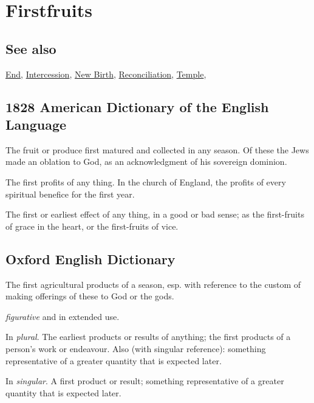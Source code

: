 \section{Firstfruits}
	\label{FIRSTFRUITS}
	
\subsection{See also}

	\hyperref[END]{End}, \hyperref[INTERCESSION]{Intercession}, \hyperref[NEWBIRTH]{New Birth}, \hyperref[RECONCILIATION]{Reconciliation}, \hyperref[TEMPLE]{Temple},

\subsection{1828 American Dictionary of the English Language} %
	\label{FIRSTFRUITS-1828}

	\begin{compactenum}
		\item[1] The fruit or produce first matured and collected in any season. Of these the Jews made an oblation to God, as an acknowledgment of his sovereign dominion.
		\item[2] The first profits of any thing. In the church of England, the profits of every spiritual benefice for the first year.
		\item[3] The first or earliest effect of any thing, in a good or bad sense; as the first-fruits of grace in the heart, or the first-fruits of vice.
	\end{compactenum}

\subsection{Oxford English Dictionary} %
	\label{FIRSTFRUITS-OED}

	\begin{compactitem}
		\item[1] The first agricultural products of a season, esp. with reference to the custom of making offerings of these to God or the gods.
		\item[2] \textit{figurative} and in extended use.
		\item[2.a] In \textit{plural}. The earliest products or results of anything; the first products of a person's work or endeavour. Also (with singular reference): something representative of a greater quantity that is expected later.
		\item[2.b] In \textit{singular}. A first product or result; something representative of a greater quantity that is expected later.
	\end{compactitem}

